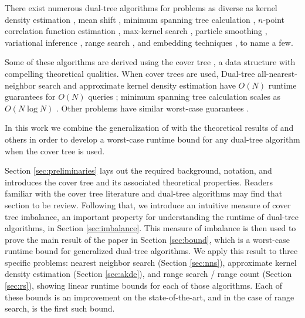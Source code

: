 \documentclass[twoside,11pt]{article} %
\begin{document}
There exist numerous dual-tree algorithms for problems as diverse as kernel
density estimation \citep{gray2003nonparametric}, mean shift \citep{wang2007fast},
minimum spanning tree calculation \citep{march2010euclidean}, $n$-point
correlation function estimation \citep{march2012fast}, max-kernel search
\citep{curtin2013fast}, particle smoothing \citep{klaas2006fast}, variational
inference \citep{amizadeh2012variational}, range search \citep{nbody}, and
embedding techniques \cite{maaten2014accelerating}, to name a few.

Some of these algorithms are derived using the cover tree \citep{langford2006}, a
data structure with compelling theoretical qualities.  When cover trees are
used, Dual-tree all-nearest-neighbor search and approximate kernel density
estimation have $O(N)$ runtime guarantees for $O(N)$ queries \citep{ram2009};
minimum spanning tree calculation scales as $O(N \log N)$
\citep{march2010euclidean}.  Other problems have similar worst-case guarantees
\citep{curtin2014dual, march2013multi}.

In this work we combine the generalization of \citet{curtin2013tree} with the
theoretical results of \citet{langford2006} and others in order to develop a
worst-case runtime bound for any dual-tree algorithm when the cover tree is
used.

Section \ref{sec:preliminaries} lays out the required background, notation, and
introduces the cover tree and its associated theoretical properties.  Readers
familiar with the cover tree literature and dual-tree algorithms
\citep[especially][]{curtin2013tree} may find that section to be review.
Following that, we introduce an intuitive measure of cover tree imbalance, an
important property for understanding the runtime of dual-tree algorithms, in
Section \ref{sec:imbalance}.  This measure of imbalance is then used to prove
the main result of the paper in Section \ref{sec:bound}, which is a worst-case
runtime bound for generalized dual-tree algorithms.  We apply this result to
three specific problems: nearest neighbor search (Section \ref{sec:nns}),
approximate kernel density estimation (Section \ref{sec:akde}), and range search
/ range count (Section \ref{sec:rs}), showing linear runtime bounds for each of
those algorithms.  Each of these bounds is an improvement on the
state-of-the-art, and in the case of range search, is the first such bound.
\end{document}
